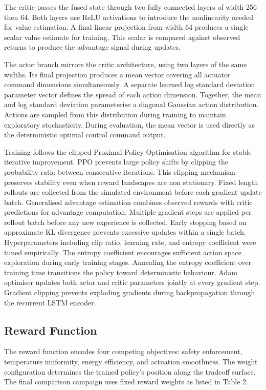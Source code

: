 \documentclass[twocolumn]{article}
\begin{document}
The critic passes the fused state through two fully connected layers of width 256 then 64. Both layers use ReLU activations to introduce the nonlinearity needed for value estimation. A final linear projection from width 64 produces a single scalar value estimate for training. This scalar is compared against observed returns to produce the advantage signal during updates.

The actor branch mirrors the critic architecture, using two layers of the same widths. Its final projection produces a mean vector covering all actuator command dimensions simultaneously. A separate learned log standard deviation parameter vector defines the spread of each action dimension. Together, the mean and log standard deviation parameterise a diagonal Gaussian action distribution. Actions are sampled from this distribution during training to maintain exploratory stochasticity. During evaluation, the mean vector is used directly as the deterministic optimal control command output.

Training follows the clipped Proximal Policy Optimisation algorithm for stable iterative improvement. PPO prevents large policy shifts by clipping the probability ratio between consecutive iterations. This clipping mechanism preserves stability even when reward landscapes are non stationary. Fixed length rollouts are collected from the simulated environment before each gradient update batch. Generalised advantage estimation combines observed rewards with critic predictions for advantage computation. Multiple gradient steps are applied per rollout batch before any new experience is collected. Early stopping based on approximate KL divergence prevents excessive updates within a single batch. Hyperparameters including clip ratio, learning rate, and entropy coefficient were tuned empirically. The entropy coefficient encourages sufficient action space exploration during early training stages. Annealing the entropy coefficient over training time transitions the policy toward deterministic behaviour. Adam optimiser updates both actor and critic parameters jointly at every gradient step. Gradient clipping prevents exploding gradients during backpropagation through the recurrent LSTM encoder.

\subsection*{Reward Function}

The reward function encodes four competing objectives: safety enforcement, temperature uniformity, energy efficiency, and actuation smoothness. The weight configuration determines the trained policy's position along the tradeoff surface. The final comparison campaign uses fixed reward weights as listed in Table 2.
\end{document}
